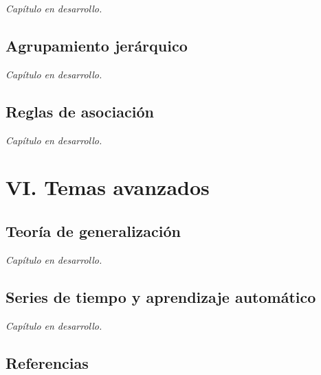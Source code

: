 \documentclass[
  spanish,
  11pt,
  letterpaper,
  DIV=11,
  numbers=noendperiod]{scrreprt}
\theoremstyle{definition}
\theoremstyle{plain}
\theoremstyle{definition}
\theoremstyle{remark}
\begin{document}
\emph{Capítulo en desarrollo.}

\chapter{Agrupamiento jerárquico}\label{agrupamiento-jeruxe1rquico}

\emph{Capítulo en desarrollo.}

\chapter{Reglas de asociación}\label{reglas-de-asociaciuxf3n}

\emph{Capítulo en desarrollo.}

\part{VI. Temas avanzados}

\chapter{Teoría de generalización}\label{teoruxeda-de-generalizaciuxf3n}

\emph{Capítulo en desarrollo.}

\chapter{Series de tiempo y aprendizaje
automático}\label{series-de-tiempo-y-aprendizaje-automuxe1tico}

\emph{Capítulo en desarrollo.}


\chapter*{Referencias}\label{referencias}


\protect{}\label{refs}
\end{document}
